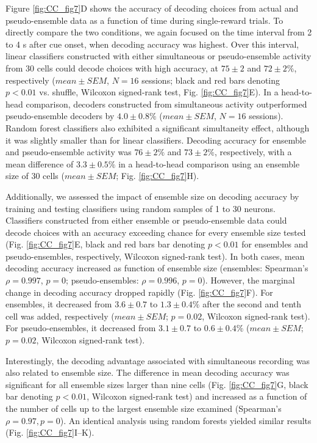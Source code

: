Figure \ref{fig:CC_fig7}D shows the accuracy of decoding choices from actual and pseudo-ensemble data as a function of time during single-reward trials. To directly compare the two conditions, we again focused on the time interval from 2 to 4 s after cue onset, when decoding accuracy was highest. Over this interval, linear classifiers constructed with either simultaneous or pseudo-ensemble activity from 30 cells could decode choices with high accuracy, at $75 \pm 2$ and $72 \pm 2\%$, respectively ($\mathit{mean}\pm\mathit{SEM}$, $N = 16$ sessions; black and red bars denoting $p < 0.01$ vs. shuffle, Wilcoxon signed-rank test, Fig. \ref{fig:CC_fig7}E). In a head-to-head comparison, decoders constructed from simultaneous activity outperformed pseudo-ensemble decoders by $4.0 \pm 0.8\%$ ($\mathit{mean}\pm\mathit{SEM}$, $N = 16$ sessions). Random forest classifiers also exhibited a significant simultaneity effect, although it was slightly smaller than for linear classifiers. Decoding accuracy for ensemble and pseudo-ensemble activity was $76 \pm 2\%$ and $73 \pm 2\%$, respectively, with a mean difference of $3.3 \pm 0.5\%$ in a head-to-head comparison using an ensemble size of 30 cells ($\mathit{mean}\pm\mathit{SEM}$; Fig. \ref{fig:CC_fig7}H).

Additionally, we assessed the impact of ensemble size on decoding accuracy by training and testing classifiers using random samples of 1 to 30 neurons. Classifiers constructed from either ensemble or pseudo-ensemble data could decode choices with an accuracy exceeding chance for every ensemble size tested (Fig. \ref{fig:CC_fig7}E, black and red bars bar denoting $p < 0.01$ for ensembles and pseudo-ensembles, respectively, Wilcoxon signed-rank test). In both cases, mean decoding accuracy increased as function of ensemble size (ensembles: Spearman's $\rho = 0.997$, $p = 0$; pseudo-ensembles: $\rho = 0.996$, $p = 0$). However, the marginal change in decoding accuracy dropped rapidly (Fig. \ref{fig:CC_fig7}F). For ensembles, it decreased from $3.6 \pm 0.7$ to $1.3 \pm 0.4\%$ after the second and tenth cell was added, respectively ($\mathit{mean}\pm\mathit{SEM}$; $p = 0.02$, Wilcoxon signed-rank test). For pseudo-ensembles, it decreased from $3.1 \pm 0.7$ to $0.6 \pm 0.4\%$ ($\mathit{mean}\pm\mathit{SEM}$; $p = 0.02$, Wilcoxon signed-rank test).

Interestingly, the decoding advantage associated with simultaneous recording was also related to ensemble size. The difference in mean decoding accuracy was significant for all ensemble sizes larger than nine cells (Fig. \ref{fig:CC_fig7}G, black bar denoting $p < 0.01$, Wilcoxon signed-rank test) and increased as a function of the number of cells up to the largest ensemble size examined (Spearman's $\rho = 0.97, p = 0$). An identical analysis using random forests yielded similar results (Fig. \ref{fig:CC_fig7}I–K).

